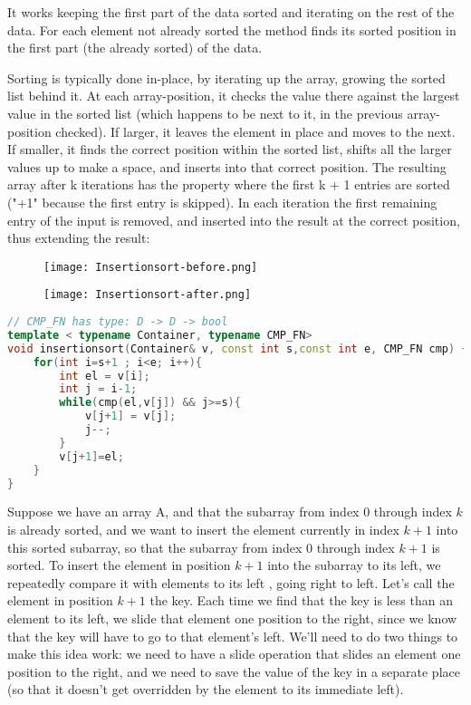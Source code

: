 It works keeping the first part of the data sorted and iterating on the rest of the data. For each element not already sorted the method finds its sorted position in the first part (the already sorted) of the data.

Sorting is typically done in-place, by iterating up the array, growing the sorted list behind it. At each array-position, it checks the value there against the largest value in the sorted list (which happens to be next to it, in the previous array-position checked). If larger, it leaves the element in place and moves to the next. If smaller, it finds the correct position within the sorted list, shifts all the larger values up to make a space, and inserts into that correct position.
The resulting array after k iterations has the property where the first k + 1 entries are sorted ("+1" because the first entry is skipped). In each iteration the first remaining entry of the input is removed, and inserted into the result at the correct position, thus extending the result:

\begin{figure}
		\texttt{[image: Insertionsort-before.png]}
\end{figure}

\begin{figure}
		\texttt{[image: Insertionsort-after.png]}
	\end{figure}


\begin{lstlisting}[language=c++, caption="Bubble-sort implementation in C++14"]
// CMP_FN has type: D -> D -> bool
template < typename Container, typename CMP_FN>
void insertionsort(Container& v, const int s,const int e, CMP_FN cmp) {
    for(int i=s+1 ; i<e; i++){
        int el = v[i];
        int j = i-1;
        while(cmp(el,v[j]) && j>=s){
            v[j+1] = v[j];
            j--;
        }
        v[j+1]=el;
    }
}
\end{lstlisting}

Suppose we have an array A, and that the subarray from index 0 through index $k$ is already sorted, and we want to insert the element currently in index $k+1$ into this sorted subarray, so that the subarray from index 0 through index $k+1$ is sorted. 
To insert the element in position $k+1$ into the subarray to its left, we repeatedly compare it with elements to its left , going right to left. Let's call the element in position $k+1$ the key. Each time we find that the key is less than an element to its left, we slide that element one position to the right, since we know that the key will have to go to that element's left. We'll need to do two things to make this idea work: we need to have a slide operation that slides an element one position to the right, and we need to save the value of the key in a separate place (so that it doesn't get overridden by the element to its immediate left). 

